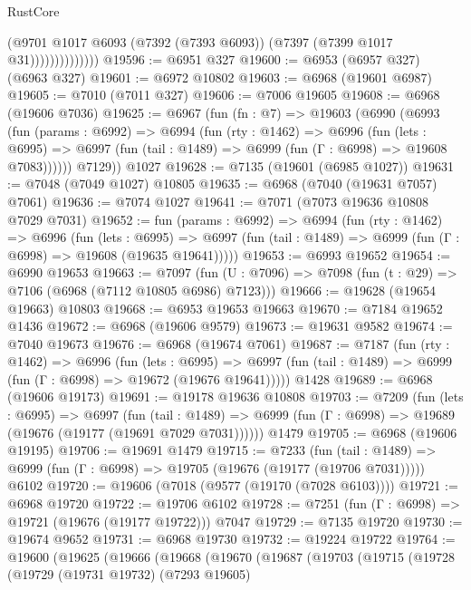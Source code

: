 \begin{lexlean}{RustCore}
\begin{coremodule}
                          (@9701
                            @1017
                            @6093
                            (@7392 (@7393 @6093))
                            (@7397 (@7399 @1017 @31))))))))))))))
@19596 := @6951 @327
@19600 := @6953 (@6957 @327) (@6963 @327)
@19601 := @6972 @10802
@19603 := @6968 (@19601 @6987)
@19605 := @7010 (@7011 @327)
@19606 := @7006 @19605
@19608 := @6968 (@19606 @7036)
@19625 := @6967
    (fun (fn : @7) =>
    @19603
      (@6990
        (@6993
          (fun (params : @6992) =>
          @6994
            (fun (rty : @1462) =>
            @6996
              (fun (lets : @6995) =>
              @6997 (fun (tail : @1489) => @6999 (fun (Γ : @6998) => @19608 @7083))))))
        @7129))
    @1027
@19628 := @7135 (@19601 (@6985 @1027))
@19631 := @7048 (@7049 @1027) @10805
@19635 := @6968 (@7040 (@19631 @7057) @7061)
@19636 := @7074 @1027
@19641 := @7071 (@7073 @19636 @10808 @7029 @7031)
@19652 := fun (params : @6992) =>
  @6994
    (fun (rty : @1462) =>
    @6996
      (fun (lets : @6995) =>
      @6997 (fun (tail : @1489) => @6999 (fun (Γ : @6998) => @19608 (@19635 @19641)))))
@19653 := @6993 @19652
@19654 := @6990 @19653
@19663 := @7097
    (fun (U : @7096) => @7098 (fun (t : @29) => @7106 (@6968 (@7112 @10805 @6986) @7123)))
@19666 := @19628 (@19654 @19663) @10803
@19668 := @6953 @19653 @19663
@19670 := @7184 @19652 @1436
@19672 := @6968 (@19606 @9579)
@19673 := @19631 @9582
@19674 := @7040 @19673
@19676 := @6968 (@19674 @7061)
@19687 := @7187
    (fun (rty : @1462) =>
    @6996
      (fun (lets : @6995) =>
      @6997 (fun (tail : @1489) => @6999 (fun (Γ : @6998) => @19672 (@19676 @19641)))))
    @1428
@19689 := @6968 (@19606 @19173)
@19691 := @19178 @19636 @10808
@19703 := @7209
    (fun (lets : @6995) =>
    @6997
      (fun (tail : @1489) =>
      @6999 (fun (Γ : @6998) => @19689 (@19676 (@19177 (@19691 @7029 @7031))))))
    @1479
@19705 := @6968 (@19606 @19195)
@19706 := @19691 @1479
@19715 := @7233
    (fun (tail : @1489) => @6999 (fun (Γ : @6998) => @19705 (@19676 (@19177 (@19706 @7031)))))
    @6102
@19720 := @19606 (@7018 (@9577 (@19170 (@7028 @6103))))
@19721 := @6968 @19720
@19722 := @19706 @6102
@19728 := @7251 (fun (Γ : @6998) => @19721 (@19676 (@19177 @19722))) @7047
@19729 := @7135 @19720
@19730 := @19674 @9652
@19731 := @6968 @19730
@19732 := @19224 @19722
@19764 := @19600
    (@19625
      (@19666
        (@19668
          (@19670
            (@19687
              (@19703
                (@19715
                  (@19728
                    (@19729
                      (@19731 @19732)
                      (@7293 @19605)

\end{coremodule}
\end{lexlean}
